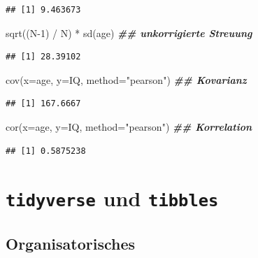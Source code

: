 \documentclass[
]{book}
\newenvironment{Shaded}{\begin{snugshade}}{\end{snugshade}}
\newcommand{\AttributeTok}[1]{\textcolor[rgb]{0.77,0.63,0.00}{#1}}
\newcommand{\DecValTok}[1]{\textcolor[rgb]{0.00,0.00,0.81}{#1}}
\newcommand{\DocumentationTok}[1]{\textcolor[rgb]{0.56,0.35,0.01}{\textbf{\textit{#1}}}}
\newcommand{\FunctionTok}[1]{\textcolor[rgb]{0.00,0.00,0.00}{#1}}
\newcommand{\NormalTok}[1]{#1}
\newcommand{\SpecialCharTok}[1]{\textcolor[rgb]{0.00,0.00,0.00}{#1}}
\newcommand{\StringTok}[1]{\textcolor[rgb]{0.31,0.60,0.02}{#1}}
\begin{document}
\begin{verbatim}
## [1] 9.463673
\end{verbatim}

\begin{Shaded}
\begin{Highlighting}[]
\FunctionTok{sqrt}\NormalTok{((N}\DecValTok{{-}1}\NormalTok{) }\SpecialCharTok{/}\NormalTok{ N) }\SpecialCharTok{*} \FunctionTok{sd}\NormalTok{(age) }\DocumentationTok{\#\# unkorrigierte Streuung}
\end{Highlighting}
\end{Shaded}

\begin{verbatim}
## [1] 28.39102
\end{verbatim}

\begin{Shaded}
\begin{Highlighting}[]
\FunctionTok{cov}\NormalTok{(}\AttributeTok{x=}\NormalTok{age, }\AttributeTok{y=}\NormalTok{IQ, }\AttributeTok{method=}\StringTok{"pearson"}\NormalTok{)  }\DocumentationTok{\#\# Kovarianz}
\end{Highlighting}
\end{Shaded}

\begin{verbatim}
## [1] 167.6667
\end{verbatim}

\begin{Shaded}
\begin{Highlighting}[]
\FunctionTok{cor}\NormalTok{(}\AttributeTok{x=}\NormalTok{age, }\AttributeTok{y=}\NormalTok{IQ, }\AttributeTok{method=}\StringTok{"pearson"}\NormalTok{)  }\DocumentationTok{\#\# Korrelation}
\end{Highlighting}
\end{Shaded}

\begin{verbatim}
## [1] 0.5875238
\end{verbatim}

\hypertarget{tidyverse-und-tibbles}{%
\chapter{\texorpdfstring{\texttt{tidyverse} und \texttt{tibbles}}{tidyverse und tibbles}}\label{tidyverse-und-tibbles}}

\hypertarget{organisatorisches-2}{%
\section{Organisatorisches}\label{organisatorisches-2}}
\end{document}

